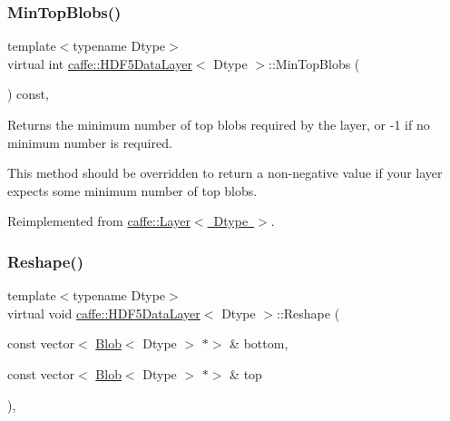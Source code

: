 \mbox{\label{classcaffe_1_1_h_d_f5_data_layer_a6833e081c29049b1392eb98fb4451697}} 
\subsubsection{\texorpdfstring{Min\+Top\+Blobs()}{MinTopBlobs()}\hspace{0.1cm}{\footnotesize\ttfamily [2/2]}}
{\footnotesize\ttfamily template$<$typename Dtype$>$ \\
virtual int \mbox{\hyperlink{classcaffe_1_1_h_d_f5_data_layer}{caffe\+::\+H\+D\+F5\+Data\+Layer}}$<$ Dtype $>$\+::Min\+Top\+Blobs (\begin{DoxyParamCaption}{ }\end{DoxyParamCaption}) const\hspace{0.3cm}{\ttfamily [inline]}, {\ttfamily [virtual]}}



Returns the minimum number of top blobs required by the layer, or -\/1 if no minimum number is required. 

This method should be overridden to return a non-\/negative value if your layer expects some minimum number of top blobs. 

Reimplemented from \mbox{\hyperlink{classcaffe_1_1_layer_ab9e4c8d642e413948b131d851a8462a4}{caffe\+::\+Layer$<$ Dtype $>$}}.

\mbox{\label{classcaffe_1_1_h_d_f5_data_layer_a38b8924648ba4ab2933fe389fa608cad}} 
\subsubsection{\texorpdfstring{Reshape()}{Reshape()}\hspace{0.1cm}{\footnotesize\ttfamily [1/2]}}
{\footnotesize\ttfamily template$<$typename Dtype$>$ \\
virtual void \mbox{\hyperlink{classcaffe_1_1_h_d_f5_data_layer}{caffe\+::\+H\+D\+F5\+Data\+Layer}}$<$ Dtype $>$\+::Reshape (\begin{DoxyParamCaption}\item[{const vector$<$ \mbox{\hyperlink{classcaffe_1_1_blob}{Blob}}$<$ Dtype $>$ $\ast$$>$ \&}]{bottom,  }\item[{const vector$<$ \mbox{\hyperlink{classcaffe_1_1_blob}{Blob}}$<$ Dtype $>$ $\ast$$>$ \&}]{top }\end{DoxyParamCaption})\hspace{0.3cm}{\ttfamily [inline]}, {\ttfamily [virtual]}}



